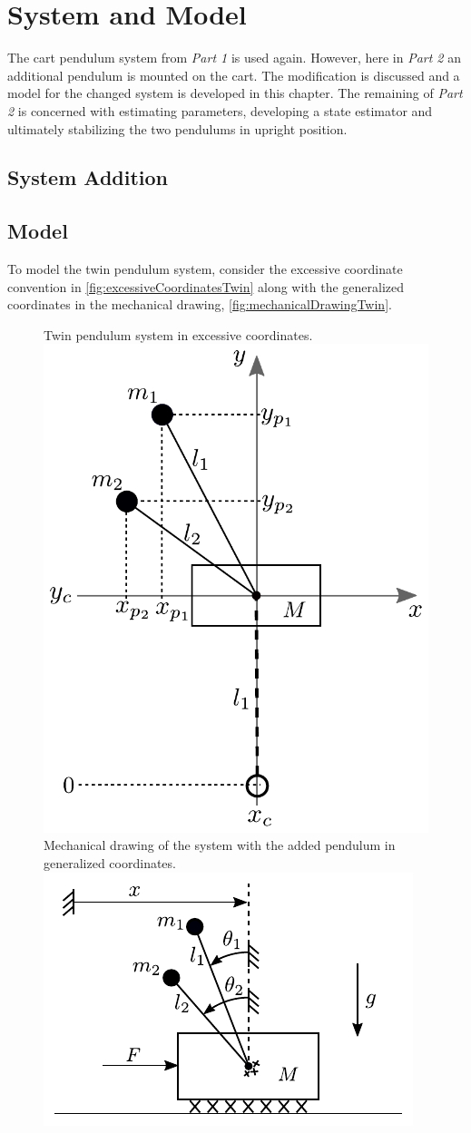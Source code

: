 \chapter{System and Model}
The cart pendulum system from \textit{Part 1} is used again. However, here in \textit{Part 2} an additional pendulum is mounted on the cart. The modification is discussed and a model for the changed system is developed in this chapter. The remaining of \textit{Part 2} is concerned with estimating parameters, developing a state estimator and ultimately stabilizing the two pendulums in upright position.

\section{System Addition}


\section{Model}
To model the twin pendulum system, consider the excessive coordinate convention in \autoref{fig:excessiveCoordinatesTwin} along with the generalized coordinates in the mechanical drawing, \autoref{fig:mechanicalDrawingTwin}.
\begin{figure}[H]
  \captionbox
  {
    Twin pendulum system in excessive coordinates.
    \label{fig:excessiveCoordinatesTwin}
  }
  {
    \hspace{-1cm}
    \includegraphics[width=.35\textwidth]{figures/excessiveCoordinatesTwin}
  }
  \hspace{40pt}
  \captionbox
  {
    Mechanical drawing of the system with the added pendulum in generalized coordinates.
    \label{fig:mechanicalDrawingTwin}
  }
  {
    \hspace{-1cm}
    \includegraphics[width=.43\textwidth]{figures/mechanicalDrawingTwin}\vspace{1.2cm}
  }  
\end{figure}
